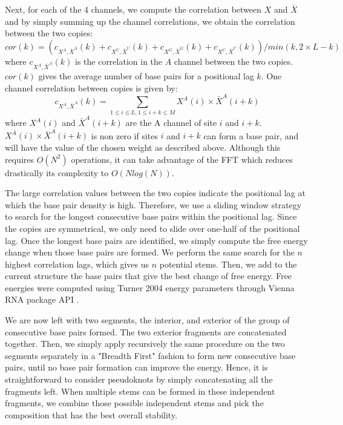 \documentclass[a4paper,12pt]{article}
\begin{document}
Next, for each of the 4 channels, we compute the correlation between \(X\) and
\(\bar{X}\) and by simply summing up the channel correlations, we obtain the
correlation between the two copies:
\begin{equation}
cor(k) = (c_{X^A,\bar{X}^A}(k) + c_{X^U,\bar{X}^U}(k) + c_{X^G,\bar{X}^G}(k) + c_{X^C,\bar{X}^C}(k)) / min(k, 2 \times L-k)
\end{equation}
where \(c_{X^A,\bar{X}^A}(k)\) is the correlation in the \(A\) channel between the
two copies. \(cor(k)\) gives the average number of base pairs for a positional lag
\(k\). One channel correlation between copies is given by:
\begin{equation}
c_{X^A,\bar{X}^A}(k) = \sum\limits_{1\leq i \leq L, 1 \leq i + k \leq M} X^A(i) \times \bar{X}^A(i+k)
\end{equation}
where \(X^A(i)\) and \(\bar{X}^A(i+k)\) are the A channel of site \(i\) and \(i+k\).
\(X^A(i) \times \bar{X}^A(i+k)\) is non zero if sites \(i\) and \(i+k\) can form a
base pair, and will have the value of the chosen weight as described above.
Although this requires \(O(N^2)\) operations, it can take advantage of the FFT
which reduces drastically its complexity to \(O(Nlog(N))\).

The large correlation values between the two copies indicate the positional lag
at which the base pair density is high. Therefore, we use a sliding window
strategy to search for the longest consecutive base pairs within the positional
lag. Since the copies are symmetrical, we only need to slide over one-half of
the positional lag. Once the longest base pairs are identified, we simply
compute the free energy change when those base pairs are formed. We perform the
same search for the \(n\) highest correlation lags, which gives us \(n\) potential
stems. Then, we add to the current structure the base pairs that give the best
change of free energy. Free energies were computed using Turner 2004 energy
parameters through Vienna RNA package API \cite{lorenz11_vienn_packag}.

We are now left with two segments, the interior, and exterior of the group of
consecutive base pairs formed. The two exterior fragments are concatenated
together. Then, we simply apply recursively the same procedure on the two
segments separately in a "Breadth First" fashion to form new consecutive base
pairs, until no base pair formation can improve the energy. Hence, it is
straightforward to consider pseudoknots by simply concatenating all the
fragments left. When multiple stems can be formed in these independent
fragments, we combine those possible independent stems and pick the composition
that has the best overall stability.
\end{document}

